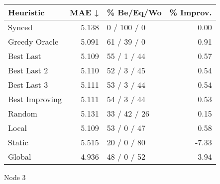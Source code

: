 \begin{tabular}{lrlr}
\toprule
\textbf{Heuristic} & \textbf{MAE ↓} & \textbf{\% Be/Eq/Wo} & \textbf{\% Improv.} \\
\midrule
            Synced &          5.138 &          0 / 100 / 0 &                0.00 \\
     Greedy Oracle &          5.091 &          61 / 39 / 0 &                0.91 \\
         Best Last &          5.109 &          55 / 1 / 44 &                0.57 \\
       Best Last 2 &          5.110 &          52 / 3 / 45 &                0.54 \\
       Best Last 3 &          5.111 &          53 / 3 / 44 &                0.54 \\
    Best Improving &          5.111 &          54 / 3 / 44 &                0.53 \\
            Random &          5.131 &         33 / 42 / 26 &                0.15 \\
             Local &          5.109 &          53 / 0 / 47 &                0.58 \\
            Static &          5.515 &          20 / 0 / 80 &               -7.33 \\
            Global &          4.936 &          48 / 0 / 52 &                3.94 \\
\bottomrule
\end{tabular}
\caption{Node 3}
\label{tab:ds_iid_lr01_le1_bs2_3}
